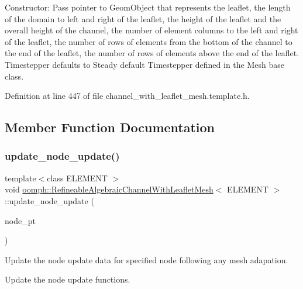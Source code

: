 Constructor\+: Pass pointer to Geom\+Object that represents the leaflet, the length of the domain to left and right of the leaflet, the height of the leaflet and the overall height of the channel, the number of element columns to the left and right of the leaflet, the number of rows of elements from the bottom of the channel to the end of the leaflet, the number of rows of elements above the end of the leaflet. Timestepper defaults to Steady default Timestepper defined in the Mesh base class. 



Definition at line 447 of file channel\+\_\+with\+\_\+leaflet\+\_\+mesh.\+template.\+h.



\subsection{Member Function Documentation}
\mbox{\label{classoomph_1_1RefineableAlgebraicChannelWithLeafletMesh_a8ee7168fbb84bb87880a2590dd52eaa8}} 
\subsubsection{\texorpdfstring{update\+\_\+node\+\_\+update()}{update\_node\_update()}}
{\footnotesize\ttfamily template$<$class E\+L\+E\+M\+E\+NT $>$ \\
void \hyperlink{classoomph_1_1RefineableAlgebraicChannelWithLeafletMesh}{oomph\+::\+Refineable\+Algebraic\+Channel\+With\+Leaflet\+Mesh}$<$ E\+L\+E\+M\+E\+NT $>$\+::update\+\_\+node\+\_\+update (\begin{DoxyParamCaption}\item[{Algebraic\+Node $\ast$\&}]{node\+\_\+pt }\end{DoxyParamCaption})}



Update the node update data for specified node following any mesh adapation. 

Update the node update functions. 

